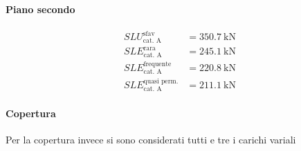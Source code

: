 \paragraph*{Piano secondo}
\begin{align*} 
	SLU^{\text{sfav}}_{\text{cat. A}}		&= \SI{350.7}{\kilo\newton} \\	
	SLE^{\text{rara}}_{\text{cat. A}} 		&= \SI{245.1}{\kilo\newton} \\
	SLE^{\text{frequente}}_{\text{cat. A}} 	&= \SI{220.8}{\kilo\newton} \\
	SLE^{\text{quasi perm.}}_{\text{cat. A}}&= \SI{211.1}{\kilo\newton}
\end{align*}
\paragraph*{Copertura} Per la copertura invece si sono considerati tutti e tre i carichi variali 
